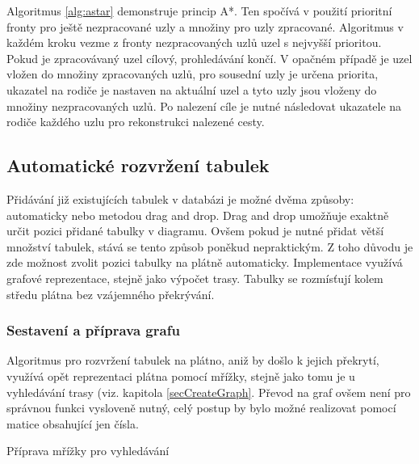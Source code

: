 \documentclass[czech,bachelor,public,dept460,male,oneside]{diploma}
\begin{document}
	Algoritmus \ref{alg:astar} demonstruje princip A*. Ten spočívá v použití prioritní fronty pro ještě nezpracované uzly a množiny pro uzly zpracované. Algoritmus v každém kroku vezme z fronty nezpracovaných uzlů uzel s nejvyšší prioritou. Pokud je zpracovávaný uzel cílový, prohledávání končí. V opačném případě je uzel vložen do množiny zpracovaných uzlů, pro sousední uzly je určena priorita, ukazatel na rodiče je nastaven na aktuální uzel a tyto uzly jsou vloženy do množiny nezpracovaných uzlů. Po nalezení cíle je nutné následovat ukazatele na rodiče každého uzlu pro rekonstrukci nalezené cesty. 
	
	\subsection{Automatické rozvržení tabulek} \label{secTablePos}
	Přidávání již existujících tabulek v databázi je možné dvěma způsoby: automaticky nebo metodou drag and drop. Drag and drop umožňuje exaktně určit pozici přidané tabulky v diagramu. Ovšem pokud je nutné přidat větší množství tabulek, stává se tento způsob poněkud nepraktickým. Z toho důvodu je zde možnost zvolit pozici tabulky na plátně automaticky. Implementace využívá grafové reprezentace, stejně jako výpočet trasy. Tabulky se rozmísťují kolem středu plátna bez vzájemného překrývání. 
		
	\subsubsection{Sestavení a příprava grafu}
	Algoritmus pro rozvržení tabulek na plátno, aniž by došlo k jejich překrytí, využívá opět reprezentaci plátna pomocí mřížky, stejně jako tomu je u vyhledávání trasy (viz. kapitola \ref{secCreateGraph}. Převod na graf ovšem není pro správnou funkci vysloveně nutný, celý postup by bylo možné realizovat pomocí matice obsahující jen čísla.
	
	\begin{algorithm}[!h]
		
				
		
		
		\caption{Příprava mřížky pro vyhledávání}
		\label{alg:preprocessGrid}
	\end{algorithm}
\end{document}
